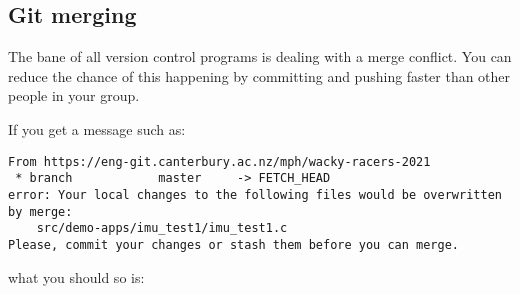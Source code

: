 
\subsection{Git merging}
\label{git-merging}

The bane of all version control programs is dealing with a merge
conflict. You can reduce the chance of this happening by committing and
pushing faster than other people in your group.

If you get a message such as:

\begin{verbatim}
From https://eng-git.canterbury.ac.nz/mph/wacky-racers-2021
 * branch            master     -> FETCH_HEAD
error: Your local changes to the following files would be overwritten by merge:
    src/demo-apps/imu_test1/imu_test1.c
Please, commit your changes or stash them before you can merge.
\end{verbatim}

what you should so is:

\begin{Shaded}
\begin{Highlighting}[]
\NormalTok{$ }
\NormalTok{$ }
\NormalTok{$ }
\NormalTok{$ }
\NormalTok{$ }
\end{Highlighting}
\end{Shaded}

